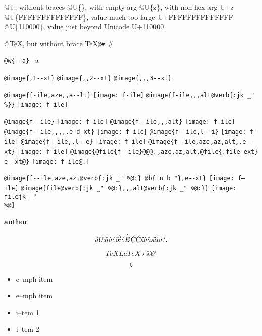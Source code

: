 \documentclass{book}
\renewcommand{\includegraphics}[1]{\fbox{FIG \detokenize{#1}}}
\begin{document}
@U, without braces @U\{\}, with empty arg 
@U\{z\}, with non-hex arg U+z
@U\{FFFFFFFFFFFFFF\}, value much too large U+FFFFFFFFFFFFFF
@U\{110000\}, value just beyond Unicode U+110000

@TeX, but without brace \TeX{}\texttt{@\#} \#

\texttt{@w\{{-}{-}a\}} \hbox{--a}

\texttt{@image\{,1{-}{-}xt\}} 
\texttt{@image\{{,}{,}2{-}{-}xt\}} 
\texttt{@image\{{,}{,},3{-}{-}xt\}} 

\texttt{@image\{f-ile,aze{,}{,}a{-}{-}lt\}} \texttt{[image: f-ile]}
\texttt{@image\{f-ile{,}{,},alt@verb\{:jk \_" \%\@\}\}} \texttt{[image: f-ile]}

\texttt{@image\{f{-}{-}ile\}} \texttt{[image: f--ile]}
\texttt{@image\{f{-}{-}ile{,}{,},alt\}} \texttt{[image: f--ile]}
\texttt{@image\{f{-}{-}ile{,}{,}{,}{,}.e-d-xt\}} \texttt{[image: f--ile]}
\texttt{@image\{f{-}{-}ile,l{-}{-}i\}} \texttt{[image: f--ile]}
\texttt{@image\{f{-}{-}ile{,}{,}l{-}{-}e\}} \texttt{[image: f--ile]}
\texttt{@image\{f{-}{-}ile,aze,az,alt,.e{-}{-}xt\}} \texttt{[image: f--ile]}
\texttt{@image\{@file\{f{-}{-}ile\}@@@.,aze,az,alt,@file\{.file ext\} e{-}{-}xt@\}} \texttt{[image: f--ile@.]}

\texttt{@image\{f{-}{-}ile,aze,az,@verb\{:jk \_" \%@:\} @b\{in b "\},e{-}{-}xt\}} \texttt{[image: f--ile]}
\texttt{@image\{file@verb\{:jk \_" \%@:\}{,}{,},alt@verb\{:jk \_" \%@:\}\}} \texttt{[image: filejk \_" \\\%@]}


{\bfseries author}%

$$
\ddot{u} \ddot{U} \tilde{n} \hat{a} \acute{e} \bar{o} \grave{i} \acute{e} \grave{\bar{E}}
\textsl{\c{\'{C}}} \textsl{\c{\'{C}}} \textsl{\H{a}} \dot{a} \mathring{a} \textsl{\t{a}}
\breve{a} \check{a}
 ? .
$$

$$
TeX LaTeX \star{} \mathord{\text{\aa{}}} \circledR{} ^{\circ{}} 
$$

$$
\mathtt{t} 
$$

\begin{itemize}[label=\emph{}]
\item e--mph item
\end{itemize}

\begin{itemize}[label=\emph{} after emph]
\item e--mph item
\end{itemize}

\begin{itemize}[label=\textbullet{} a--n itemize line]
\item i--tem 1
\item i--tem 2
\end{itemize}
\end{document}

